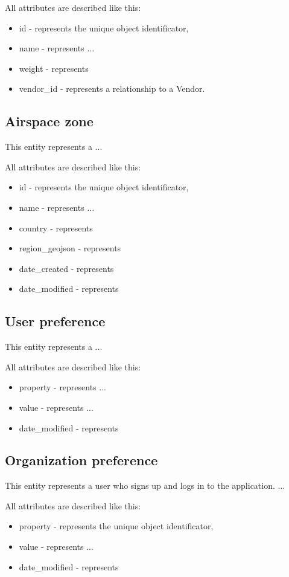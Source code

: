 All attributes are described like this:
\begin{itemize}
    \item id - represents the unique object identificator,
    \item name - represents ...
    \item weight - represents
    \item vendor\_id - represents a relationship to a Vendor.
\end{itemize}

\subsection{Airspace zone}\label{subsec:airspace-zone}
This entity represents a ...

All attributes are described like this:
\begin{itemize}
    \item id - represents the unique object identificator,
    \item name - represents ...
    \item country - represents
    \item region\_geojson - represents
    \item date\_created - represents
    \item date\_modified - represents
\end{itemize}

\subsection{User preference}\label{subsec:user-preference}
This entity represents a ...

All attributes are described like this:
\begin{itemize}
    \item property - represents ...
    \item value - represents ...
    \item date\_modified - represents
\end{itemize}

\subsection{Organization preference}\label{subsec:organization-preference}
This entity represents a user who signs up and logs in to the application.
...

All attributes are described like this:
\begin{itemize}
    \item property - represents the unique object identificator,
    \item value - represents ...
    \item date\_modified - represents
\end{itemize}


